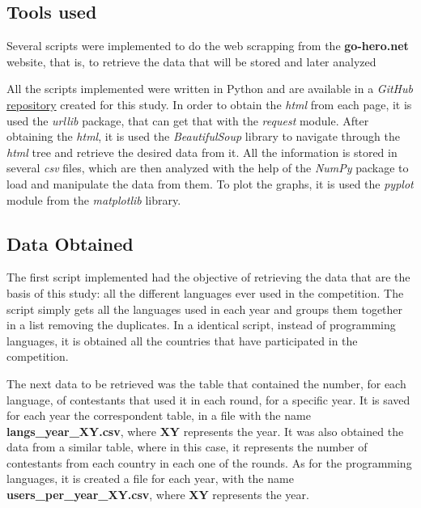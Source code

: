 \documentclass{article}
\begin{document}
\begin{multicols*}{2}
\subsection{Tools used}

Several scripts were implemented to do the web scrapping from the \textbf{go-hero.net} website, that is, to retrieve the data that will be stored and later analyzed%

All the scripts implemented were written in Python and are available in a \textit{GitHub} \href{https://github.com/Tiaghoul/iic-GoogleJamStudy}{repository} created for this study. In order to obtain the \textit{html} from each page, it is used the \textit{urllib} package, that can get that with the \textit{request} module. After obtaining the \textit{html}, it is used the \textit{BeautifulSoup} library to navigate through the \textit{html} tree and retrieve the desired data from it. All the information is stored in several \textit{csv} files, which are then analyzed with the help of the \textit{NumPy} package to load and manipulate the data from them. To plot the graphs, it is used the \textit{pyplot} module from the \textit{matplotlib} library.


\subsection{Data Obtained}

The first script implemented had the objective of retrieving the data that are the basis of this study: all the different languages ever used in the competition. The script simply gets all the languages used in each year and groups them together in a list removing the duplicates. In a identical script, instead of programming languages, it is obtained all the countries that have participated in the competition.

The next data to be retrieved was the table that contained the number, for each language, of contestants that used it in each round, for a specific year. It is saved for each year the correspondent table, in a file with the name \textbf{langs\_year\_XY.csv}, where \textbf{XY} represents the year.
It was also obtained the data from a similar table, where in this case, it represents the number of contestants from each country in each one of the rounds. As for the programming languages, it is created a file for each year, with the name \textbf{users\_per\_year\_XY.csv}, where \textbf{XY} represents the year.


\end{multicols*}
\end{document}
